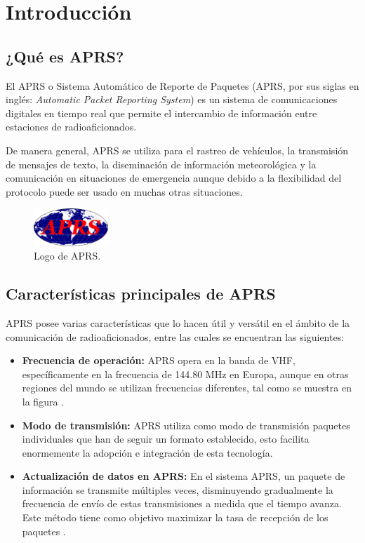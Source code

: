 \chapter{Introducción}
\label{cap:introduccion}

\section{¿Qué es APRS?}

El APRS o Sistema Automático de Reporte de Paquetes (APRS, por sus siglas en inglés: \textit{Automatic Packet Reporting System}) es un sistema de comunicaciones digitales en tiempo real que permite el intercambio de información entre estaciones de radioaficionados.

De manera general, APRS se utiliza para el rastreo de vehículos, la transmisión de mensajes de texto, la diseminación de información meteorológica y la comunicación en situaciones de emergencia aunque debido a la flexibilidad del protocolo puede ser usado en muchas otras situaciones.

\begin{figure}[h!]
	\centering
	\includegraphics[width=0.25\textwidth]{Imagenes/Chapter_1/APRS_logo.png}
	\caption{Logo de APRS.}
	\label{fig:aprs-logo-es}
\end{figure}

\section{Características principales de APRS}

APRS posee varias características que lo hacen útil y versátil en el ámbito de la comunicación de radioaficionados, entre las cuales se encuentran las siguientes:
\begin{itemize}
	\item \textbf{Frecuencia de operación:} APRS opera en la banda de VHF, específicamente en la frecuencia de 144.80 MHz en Europa, aunque en otras regiones del mundo se utilizan frecuencias diferentes, tal como se muestra en la figura .
	\item \textbf{Modo de transmisión:} APRS utiliza como modo de transmisión paquetes individuales que han de seguir un formato establecido, esto facilita enormemente la adopción e integración de esta tecnología.
	\item \textbf{Actualización de datos en APRS:} En el sistema APRS, un paquete de información se transmite múltiples veces, disminuyendo gradualmente la frecuencia de envío de estas transmisiones a medida que el tiempo avanza. Este método tiene como objetivo maximizar la tasa de recepción de los paquetes \cite{QueEsAPRS}.
\end{itemize}

